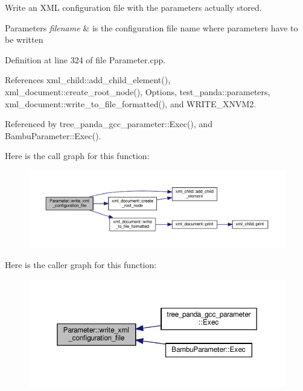 Write an X\+ML configuration file with the parameters actually stored. 


\begin{DoxyParams}{Parameters}
{\em filename} & is the configuration file name where parameters have to be written \\
\hline
\end{DoxyParams}


Definition at line 324 of file Parameter.\+cpp.



References xml\+\_\+child\+::add\+\_\+child\+\_\+element(), xml\+\_\+document\+::create\+\_\+root\+\_\+node(), Options, test\+\_\+panda\+::parameters, xml\+\_\+document\+::write\+\_\+to\+\_\+file\+\_\+formatted(), and W\+R\+I\+T\+E\+\_\+\+X\+N\+V\+M2.



Referenced by tree\+\_\+panda\+\_\+gcc\+\_\+parameter\+::\+Exec(), and Bambu\+Parameter\+::\+Exec().

Here is the call graph for this function\+:
\nopagebreak
\begin{figure}[H]
\begin{center}
\leavevmode
\includegraphics[width=350pt]{dc/dab/classParameter_aad809169029074f9f29fb1c7d380be03_cgraph}
\end{center}
\end{figure}
Here is the caller graph for this function\+:
\nopagebreak
\begin{figure}[H]
\begin{center}
\leavevmode
\includegraphics[width=350pt]{dc/dab/classParameter_aad809169029074f9f29fb1c7d380be03_icgraph}
\end{center}
\end{figure}


